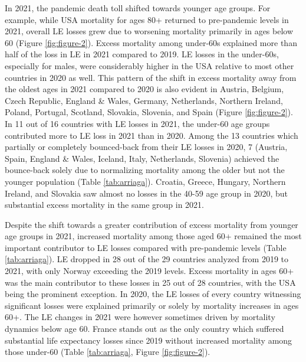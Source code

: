 \documentclass[12pt]{article}
\begin{document}
In 2021, the pandemic death toll shifted towards younger age groups. For example, while USA mortality for ages 80+ returned to pre-pandemic levels in 2021, overall LE losses grew due to worsening mortality primarily in ages below 60 (Figure \ref{fig:figure-2}). Excess mortality among under-60s explained more than half of the loss in LE in 2021 compared to 2019. LE losses in the under-60s, especially for males, were considerably higher in the USA relative to most other countries in 2020 as well.\citealp{Aburto2021b} This pattern of the shift in excess mortality away from the oldest ages in 2021 compared to 2020 is also evident in Austria, Belgium, Czech Republic, England \& Wales, Germany, Netherlands, Northern Ireland, Poland, Portugal, Scotland, Slovakia, Slovenia, and Spain (Figure \ref{fig:figure-2}). In 11 out of 16 countries with LE losses in 2021, the under-60 age groups contributed more to LE loss in 2021 than in 2020. Among the 13 countries which partially or completely bounced-back from their LE losses in 2020, 7 (Austria, Spain, England \& Wales, Iceland, Italy, Netherlands, Slovenia) achieved the bounce-back solely due to normalizing mortality among the older but not the younger population (Table \ref{tab:arriaga}). Croatia, Greece, Hungary, Northern Ireland, and Slovakia saw almost no losses in the 40-59 age group in 2020, but substantial excess mortality in the same group in 2021.

Despite the shift towards a greater contribution of excess mortality from younger age groups in 2021, increased mortality among those aged 60+ remained the most important contributor to LE losses compared with pre-pandemic levels (Table \ref{tab:arriaga}). LE dropped in 28 out of the 29 countries analyzed from 2019 to 2021, with only Norway exceeding the 2019 levels. Excess mortality in ages 60+ was the main contributor to these losses in 25 out of 28 countries, with the USA being the prominent exception. In 2020, the LE losses of every country witnessing significant losses were explained primarily or solely by mortality increases in ages 60+. The LE changes in 2021 were however sometimes driven by mortality dynamics below age 60. France stands out as the only country which suffered substantial life expectancy losses since 2019 without increased mortality among those under-60 (Table \ref{tab:arriaga}, Figure \ref{fig:figure-2}).
\end{document}
